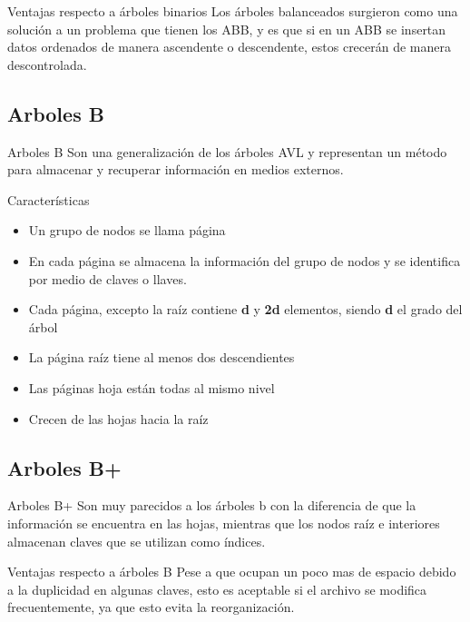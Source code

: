 \documentclass{beamer}
\begin{document}
\begin{frame}{Ventajas respecto a \'arboles binarios}
	Los \'arboles balanceados surgieron como una soluci\'on a un problema que tienen los ABB, y es que si en un ABB se insertan datos ordenados de manera ascendente o descendente, estos crecer\'an de manera descontrolada.
\end{frame}

\subsection{Arboles B}
\begin{frame}{Arboles B}
	Son una generalizaci\'on de los \'arboles AVL y representan un m\'etodo para almacenar y recuperar informaci\'on en medios externos.
\end{frame}

\begin{frame}{Caracter\'isticas}
	\begin{itemize}
		\item Un grupo de nodos se llama p\'agina
		\item En cada p\'agina se almacena la informaci\'on del grupo de nodos y se identifica por medio de claves o llaves.
		\item Cada p\'agina, excepto la ra\'iz contiene \textbf{d} y \textbf{2d} elementos, siendo \textbf{d} el grado del \'arbol
		\item La p\'agina ra\'iz tiene al menos dos descendientes
		\item Las p\'aginas hoja est\'an todas al mismo nivel
		\item Crecen de las hojas hacia la ra\'iz
	\end{itemize}
\end{frame}

\subsection{Arboles B+}

\begin{frame}{Arboles B+}
	Son muy parecidos a los \'arboles b con la diferencia de que la informaci\'on se encuentra en las hojas, mientras que los nodos ra\'iz e interiores almacenan claves que se utilizan como \'indices.
\end{frame}

\begin{frame}{Ventajas respecto a \'arboles B}
	Pese a que ocupan un poco mas de espacio debido a la duplicidad en algunas claves, esto es aceptable si el archivo se modifica frecuentemente, ya que esto evita la reorganizaci\'on.
\end{frame}
\end{document}

